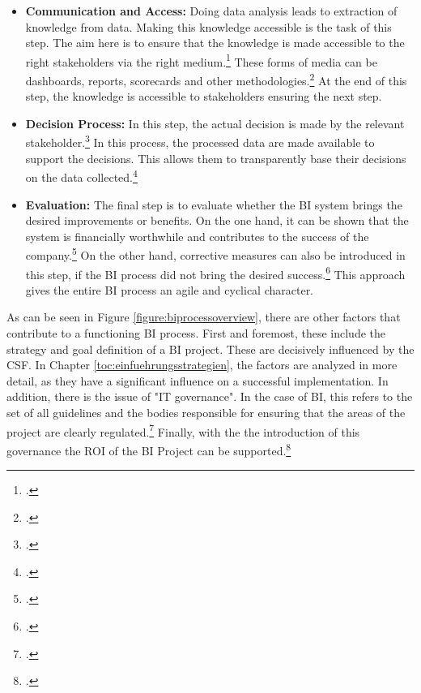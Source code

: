 \begin{itemize}
    decision-making processes.\footcite[Cf.][p. 94]{hovcevar2010assessing}
    \item \textbf{Communication and Access: }Doing data analysis leads to extraction of knowledge from data.
    Making this knowledge accessible is the task of this step. The aim here is to ensure that the knowledge
    is made accessible to the right stakeholders via the right medium.\footcite[Cf.][p. 11]{foley2010business} These
    forms of media can be dashboards, reports, scorecards and other methodologies.\footcite[Cf.][pp. 21]{niu2009cognition} At the end
    of this step, the knowledge is accessible to stakeholders ensuring the next step.
    \item \textbf{Decision Process: }In this step, the actual decision is made by the relevant stakeholder.\footcite[Cf.][p. 12]{foley2010business}
    In this process, the processed data are made available to support the
    decisions. This allows them to transparently base their decisions on the data collected.\footcite[Cf.][p. 13]{kasemsap2016fundamentals}
    \item \textbf{Evaluation: }The final step is to evaluate whether the \ac{BI} system brings the desired improvements or benefits.
    On the one hand, it can be shown that the system is financially worthwhile and contributes to the success of the company.\footcite[Cf.][p. 12]{foley2010business}
    On the other hand, corrective measures can also be introduced in this step,
    if the \ac{BI} process did not bring the desired success.\footcite[Cf.][p. 12]{foley2010business}
    This approach gives the entire \ac{BI} process an agile and cyclical character.
\end{itemize}

As can be seen in Figure \ref{figure:biprocessoverview}, there are other factors that contribute to a functioning
\ac{BI} process. First and foremost, these include the strategy and goal definition of a \ac{BI} project. These are decisively
influenced by the \ac{CSF}. In Chapter \ref{toc:einfuehrungsstrategien}, the factors are analyzed in more detail, as they have a
significant influence on a successful implementation. In addition, there is the issue of "IT governance".
In the case of \ac{BI}, this refers to the set of all guidelines and the bodies responsible for ensuring that the
areas of the project are clearly regulated.\footcite[Cf.][p. 8]{foley2010business} Finally, with the
the introduction of this governance the \ac{ROI} of the \ac{BI} Project can be supported.\footcite[Cf.][p. 8]{foley2010business}

